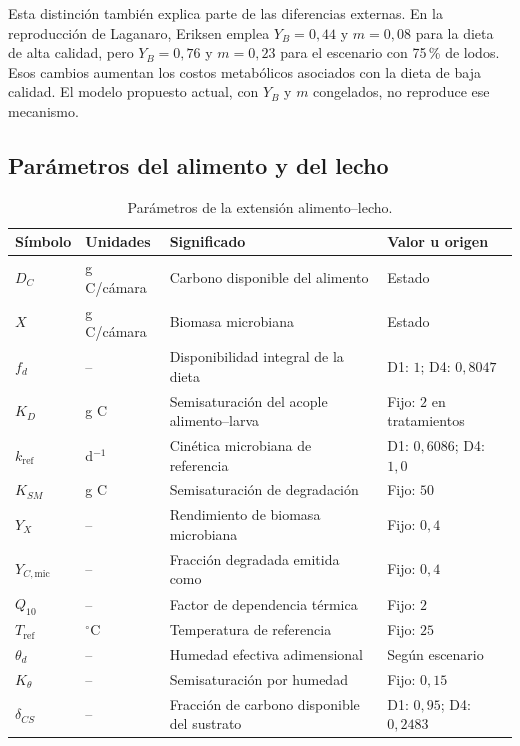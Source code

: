 Esta distinción también explica parte de las diferencias externas. En
la reproducción de Laganaro, Eriksen emplea $Y_B=0{,}44$ y $m=0{,}08$
para la dieta de alta calidad, pero $Y_B=0{,}76$ y $m=0{,}23$ para el
escenario con 75\,\% de lodos. Esos cambios aumentan los costos
metabólicos asociados con la dieta de baja calidad. El modelo propuesto
actual, con $Y_B$ y $m$ congelados, no reproduce ese mecanismo.

\subsection{Parámetros del alimento y del lecho}

\begin{table}[H]
\centering
\small
\caption{Parámetros de la extensión alimento--lecho.}
\begin{tabularx}{\textwidth}{l l X l}
\toprule
Símbolo & Unidades & Significado & Valor u origen \\
\midrule
$D_C$ & g C/cámara & Carbono disponible del alimento & Estado \\
$X$ & g C/cámara & Biomasa microbiana & Estado \\
$f_d$ & -- & Disponibilidad integral de la dieta &
D1: $1$; D4: $0{,}8047$ \\
$K_D$ & g C & Semisaturación del acople alimento--larva &
Fijo: $2$ en tratamientos \\
$k_{\mathrm{ref}}$ & d$^{-1}$ & Cinética microbiana de referencia &
D1: $0{,}6086$; D4: $1{,}0$ \\
$K_{SM}$ & g C & Semisaturación de degradación & Fijo: $50$ \\
$Y_X$ & -- & Rendimiento de biomasa microbiana & Fijo: $0{,}4$ \\
$Y_{C,\mathrm{mic}}$ & -- & Fracción degradada emitida como \co{} &
Fijo: $0{,}4$ \\
$Q_{10}$ & -- & Factor de dependencia térmica & Fijo: $2$ \\
$T_{\mathrm{ref}}$ & $^\circ$C & Temperatura de referencia &
Fijo: $25$ \\
$\theta_d$ & -- & Humedad efectiva adimensional &
Según escenario \\
$K_\theta$ & -- & Semisaturación por humedad & Fijo: $0{,}15$ \\
$\delta_{CS}$ & -- & Fracción de carbono disponible del sustrato &
D1: $0{,}95$; D4: $0{,}2483$ \\
\bottomrule
\end{tabularx}
\end{table}

